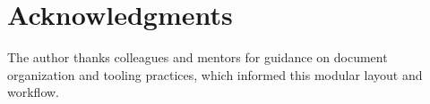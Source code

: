 \chapter*{Acknowledgments}
The author thanks colleagues and mentors for guidance on document organization and tooling practices, which informed this modular layout and workflow.
